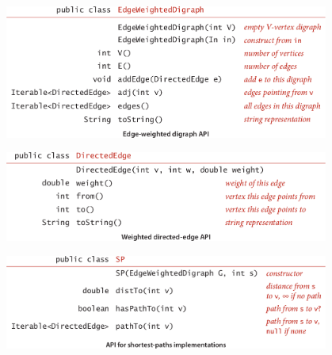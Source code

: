 \documentclass[addpoints]{exam}
\begin{document}
\begin{questions}
\begin{center}
		\includegraphics[width=0.8\textwidth]{Pics/API-EWDG}

		\vspace{1cm}

		\includegraphics[width=0.8\textwidth]{Pics/API-DE}

		\vspace{1cm}

		\includegraphics[width=0.8\textwidth]{Pics/API-SP}
	\end{center}


\end{questions}
\end{document}
